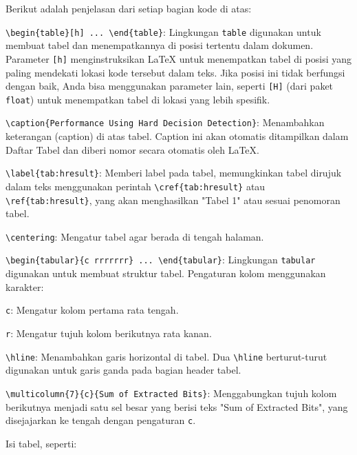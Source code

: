 \noindent Berikut adalah penjelasan dari setiap bagian kode di atas:

\begin{packed_enum}
    \item \texttt{\textbackslash begin\{table\}[h] ... \textbackslash end\{table\}}: Lingkungan \texttt{table} digunakan untuk membuat tabel dan menempatkannya di posisi tertentu dalam dokumen. Parameter \texttt{[h]} menginstruksikan LaTeX untuk menempatkan tabel di posisi yang paling mendekati lokasi kode tersebut dalam teks. Jika posisi ini tidak berfungsi dengan baik, Anda bisa menggunakan parameter lain, seperti \texttt{[H]} (dari paket \texttt{float}) untuk menempatkan tabel di lokasi yang lebih spesifik.
    \item \texttt{\textbackslash caption\{Performance Using Hard Decision Detection\}}: Menambahkan keterangan (caption) di atas tabel. Caption ini akan otomatis ditampilkan dalam Daftar Tabel dan diberi nomor secara otomatis oleh LaTeX.
    \item \texttt{\textbackslash label\{tab:hresult\}}: Memberi label pada tabel, memungkinkan tabel dirujuk dalam teks menggunakan perintah \texttt{\textbackslash cref\{tab:hresult\}} atau \texttt{\textbackslash ref\{tab:hresult\}}, yang akan menghasilkan "Tabel 1" atau sesuai penomoran tabel.
    \item \texttt{\textbackslash centering}: Mengatur tabel agar berada di tengah halaman.
    \item \texttt{\textbackslash begin\{tabular\}\{c rrrrrrr\} ... \textbackslash end\{tabular\}}: Lingkungan \texttt{tabular} digunakan untuk membuat struktur tabel. Pengaturan kolom menggunakan karakter:
        \begin{packed_enum}
            \item \texttt{c}: Mengatur kolom pertama rata tengah.
            \item \texttt{r}: Mengatur tujuh kolom berikutnya rata kanan.
        \end{packed_enum}
    \item \texttt{\textbackslash hline}: Menambahkan garis horizontal di tabel. Dua \texttt{\textbackslash hline} berturut-turut digunakan untuk garis ganda pada bagian header tabel.
    \item \texttt{\textbackslash multicolumn\{7\}\{c\}\{Sum of Extracted Bits\}}: Menggabungkan tujuh kolom berikutnya menjadi satu sel besar yang berisi teks "Sum of Extracted Bits", yang disejajarkan ke tengah dengan pengaturan \texttt{c}.
    \item Isi tabel, seperti:

\end{packed_enum}
